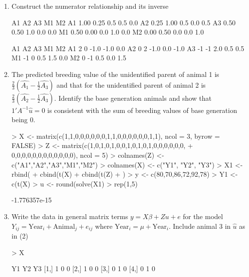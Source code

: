 \documentclass[12pt,a4paper]{paper}
\begin{document}
\begin{enumerate}
\item Construct the numerator relationship and its inverse
\begin{Schunk}
\begin{Soutput}
     A1   A2  A3  M1  M2
A1 1.00 0.25 0.5 0.5 0.0
A2 0.25 1.00 0.5 0.0 0.5
A3 0.50 0.50 1.0 0.0 0.0
M1 0.50 0.00 0.0 1.0 0.0
M2 0.00 0.50 0.0 0.0 1.0
\end{Soutput}
\begin{Soutput}
   A1 A2   A3   M1   M2
A1  2  0 -1.0 -1.0  0.0
A2  0  2 -1.0  0.0 -1.0
A3 -1 -1  2.0  0.5  0.5
M1 -1  0  0.5  1.5  0.0
M2  0 -1  0.5  0.0  1.5
\end{Soutput}
\end{Schunk}
\item The predicted breeding value of the unidentified parent of animal 1 is $\frac{2}{3}(\hat{A_{1}}-\frac{1}{2}\hat{A_{3}})$ and that for the unidentified parent of animal 2 is $\frac{2}{3}(\hat{A_{2}}-\frac{1}{2}\hat{A_{3}})$. Identify the base generation animals and show that $1'A^{-1}\hat{u} = 0$ is consistent with the sum of breeding values of base generation being 0.
\begin{Schunk}
\begin{Sinput}
> X <- matrix(c(1,1,0,0,0,0,0,0,1,1,0,0,0,0,0,0,1,1), ncol = 3, byrow = FALSE)
> Z <- matrix(c(1,0,1,0,1,0,0,1,0,1,0,1,0,0,0,0,0,0,
+               0,0,0,0,0,0,0,0,0,0,0,0), ncol = 5)
> colnames(Z) <- c("A1","A2","A3","M1","M2")
> colnames(X) <- c("Y1", "Y2", "Y3")
> X1 <- rbind(
+   cbind(t(X) %*% X, t(X) %*% Z), 
+   cbind(t(Z) %*% X, t(Z) %*% Z + Ainv)
+   )
> y <- c(80,70,86,72,92,78)
> Y1 <- c(t(X) %*% y,t(Z) %*% y)
> u <- round(solve(X1) %*% Y1,2)
> rep(1,5) %*% (Ainv %*% u[4:8])
\end{Sinput}
\begin{Soutput}
              [,1]
[1,] -1.776357e-15
\end{Soutput}
\end{Schunk}
\item Write the data in general matrix terms $y = X\beta + Zu + e$ for the model $Y_{ij} = \text{Year}_{i} + \text{Animal}_{j} + e_{ij}$ where $\text{Year}_{i} = \mu + \text{Year}_{i}$. Include animal $3$ in $\hat{u}$ as in (2)
\begin{Schunk}
\begin{Sinput}
> X
\end{Sinput}
\begin{Soutput}
     Y1 Y2 Y3
[1,]  1  0  0
[2,]  1  0  0
[3,]  0  1  0
[4,]  0  1  0

\end{Soutput}
\end{Schunk}
\end{enumerate}
\end{document}
